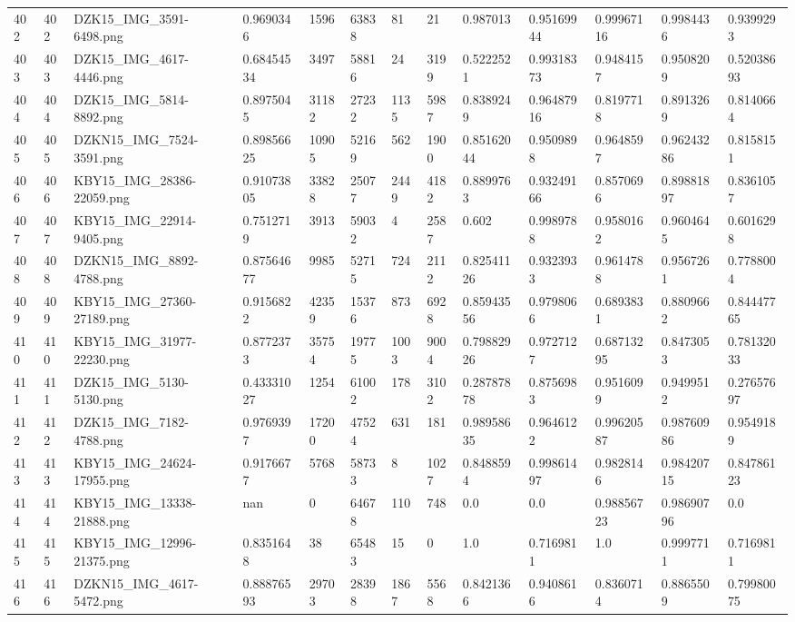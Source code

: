 \documentclass[11pt, a4paper, twoside]{report}
\begin{document}
\begin{longtable}[c]{@{}lllllllllllll@{}}
402 & 402 & DZK15\_IMG\_3591-6498.png & 0.9690346 & 1596 & 63838 & 81 & 21 & 0.987013 & 0.95169944 & 0.99967116 & 0.9984436 & 0.9399293 \\
403 & 403 & DZK15\_IMG\_4617-4446.png & 0.68454534 & 3497 & 58816 & 24 & 3199 & 0.5222521 & 0.99318373 & 0.9484157 & 0.9508209 & 0.52038693 \\
404 & 404 & DZK15\_IMG\_5814-8892.png & 0.8975045 & 31182 & 27232 & 1135 & 5987 & 0.8389249 & 0.96487916 & 0.8197718 & 0.8913269 & 0.8140664 \\
405 & 405 & DZKN15\_IMG\_7524-3591.png & 0.89856625 & 10905 & 52169 & 562 & 1900 & 0.85162044 & 0.9509898 & 0.9648597 & 0.96243286 & 0.8158151 \\
406 & 406 & KBY15\_IMG\_28386-22059.png & 0.91073805 & 33828 & 25077 & 2449 & 4182 & 0.8899763 & 0.93249166 & 0.8570696 & 0.89881897 & 0.8361057 \\
407 & 407 & KBY15\_IMG\_22914-9405.png & 0.7512719 & 3913 & 59032 & 4 & 2587 & 0.602 & 0.9989788 & 0.9580162 & 0.9604645 & 0.6016298 \\
408 & 408 & DZKN15\_IMG\_8892-4788.png & 0.87564677 & 9985 & 52715 & 724 & 2112 & 0.82541126 & 0.9323933 & 0.9614788 & 0.9567261 & 0.7788004 \\
409 & 409 & KBY15\_IMG\_27360-27189.png & 0.9156822 & 42359 & 15376 & 873 & 6928 & 0.85943556 & 0.9798066 & 0.6893831 & 0.8809662 & 0.84447765 \\
410 & 410 & KBY15\_IMG\_31977-22230.png & 0.8772373 & 35754 & 19775 & 1003 & 9004 & 0.79882926 & 0.9727127 & 0.68713295 & 0.8473053 & 0.78132033 \\
411 & 411 & DZK15\_IMG\_5130-5130.png & 0.43331027 & 1254 & 61002 & 178 & 3102 & 0.28787878 & 0.8756983 & 0.9516099 & 0.9499512 & 0.27657697 \\
412 & 412 & DZK15\_IMG\_7182-4788.png & 0.9769397 & 17200 & 47524 & 631 & 181 & 0.98958635 & 0.9646122 & 0.99620587 & 0.98760986 & 0.9549189 \\
413 & 413 & KBY15\_IMG\_24624-17955.png & 0.9176677 & 5768 & 58733 & 8 & 1027 & 0.8488594 & 0.99861497 & 0.9828146 & 0.98420715 & 0.84786123 \\
414 & 414 & KBY15\_IMG\_13338-21888.png & nan & 0 & 64678 & 110 & 748 & 0.0 & 0.0 & 0.98856723 & 0.98690796 & 0.0 \\
415 & 415 & KBY15\_IMG\_12996-21375.png & 0.8351648 & 38 & 65483 & 15 & 0 & 1.0 & 0.7169811 & 1.0 & 0.9997711 & 0.7169811 \\
416 & 416 & DZKN15\_IMG\_4617-5472.png & 0.88876593 & 29703 & 28398 & 1867 & 5568 & 0.8421366 & 0.9408616 & 0.8360714 & 0.8865509 & 0.79980075 \\

\end{longtable}
\end{document}

